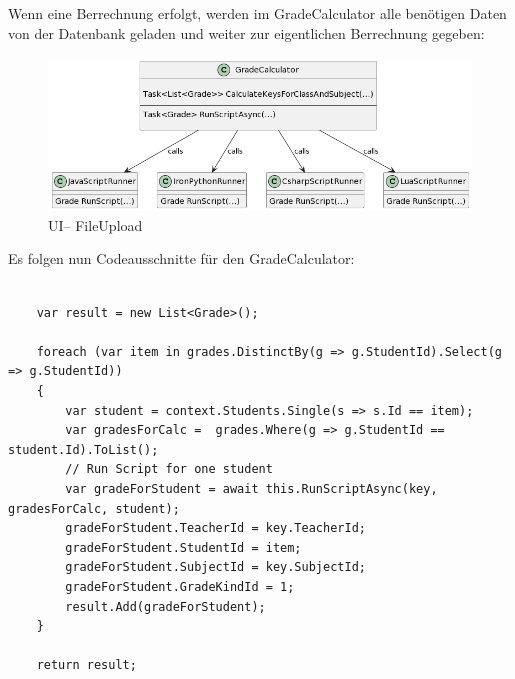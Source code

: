 Wenn eine Berrechnung erfolgt, werden im GradeCalculator alle benötigen Daten von der Datenbank geladen und weiter zur eigentlichen Berrechnung gegeben:

\begin{figure}[H]
    \centering
    \includegraphics[scale=0.5]{pics/LogicClassDiagram.png}
    \caption{UI-- FileUpload}
    \label{fig:impl:Logic}
\end{figure}
\newpage
Es folgen nun Codeausschnitte für den GradeCalculator: 

\begin{lstlisting}[language={[Sharp]C}, caption=Code for loading data for Calculation, label=lst:imp:calc]
                 
    var result = new List<Grade>();

    foreach (var item in grades.DistinctBy(g => g.StudentId).Select(g => g.StudentId))
    {
        var student = context.Students.Single(s => s.Id == item);
        var gradesForCalc =  grades.Where(g => g.StudentId == student.Id).ToList();
        // Run Script for one student
        var gradeForStudent = await this.RunScriptAsync(key, gradesForCalc, student);
        gradeForStudent.TeacherId = key.TeacherId;
        gradeForStudent.StudentId = item;
        gradeForStudent.SubjectId = key.SubjectId;
        gradeForStudent.GradeKindId = 1;
        result.Add(gradeForStudent);
    }

    return result;

\end{lstlisting}

